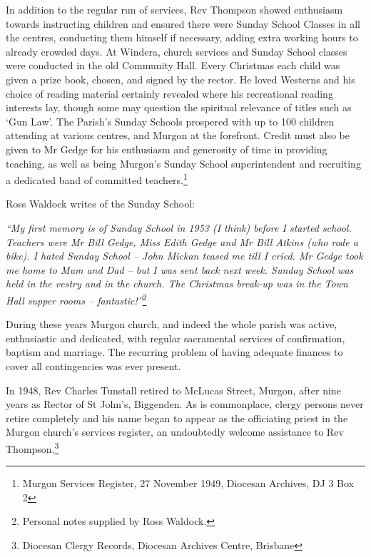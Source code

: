 In addition to the regular run of services, Rev Thompson showed enthusiasm towards instructing children and ensured there were Sunday School Classes in all the centres, conducting them himself if necessary, adding extra working hours to already crowded days. At Windera, church services and Sunday School classes were conducted in the old Community Hall. Every Christmas each child was given a prize book, chosen, and signed by the rector. He loved Westerns and his choice of reading material certainly revealed where his recreational reading interests lay, though some may question the spiritual relevance of titles such as `Gun Law'. The Parish's Sunday Schools prospered with up to 100 children attending at various centres, and Murgon at the forefront. Credit must also be given to Mr Gedge for his enthusiasm and generosity of time in providing teaching, as well as being Murgon's Sunday School superintendent and recruiting a dedicated band of committed teachers.\footnote{Murgon Services Register, 27 November 1949, Diocesan Archives, DJ 3 Box 2}


Ross Waldock writes of the Sunday School:



\emph{``My first memory is of Sunday School in 1953 (I think) before I started school. Teachers were Mr Bill Gedge, Miss Edith Gedge and Mr Bill Atkins (who rode a bike). I hated Sunday School -- John Mickan teased me till I cried. Mr Gedge took me home to Mum and Dad -- but I was sent back next week. Sunday School was held in the vestry and in the church. The Christmas break-up was in the Town Hall supper rooms -- fantastic!''}\footnote{Personal notes supplied by Ross Waldock.}


\smallskip


During these years Murgon church, and indeed the whole parish was active, enthusiastic and dedicated, with regular sacramental services of confirmation, baptism and marriage. The recurring problem of having adequate finances to cover all contingencies was ever present.



In 1948, Rev Charles Tunstall retired to McLucas Street, Murgon, after nine years as Rector of St John's, Biggenden. As is commonplace, clergy persons never retire completely and his name began to appear as the officiating priest in the Murgon church's services register, an undoubtedly welcome assistance to Rev Thompson.\footnote{Diocesan Clergy Records, Diocesan Archives Centre, Brisbane}


